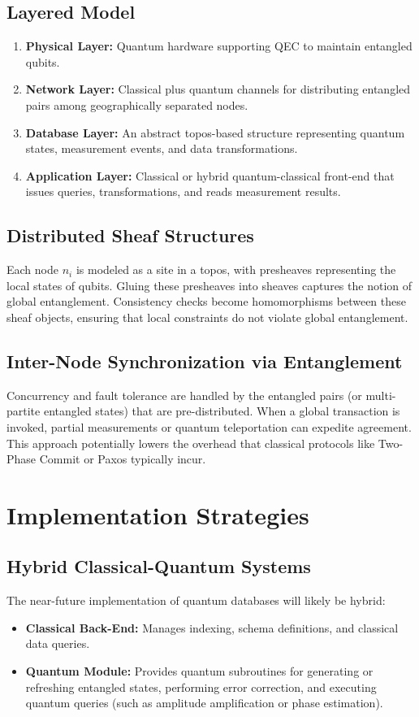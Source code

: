 \documentclass[12pt]{article}
\theoremstyle{definition}
\theoremstyle{remark}
\begin{document}
\subsection{Layered Model}
\begin{enumerate}[label=(\roman*)]
    \item \textbf{Physical Layer:} Quantum hardware supporting QEC to maintain entangled qubits.
    \item \textbf{Network Layer:} Classical plus quantum channels for distributing entangled pairs among geographically separated nodes.
    \item \textbf{Database Layer:} An abstract topos-based structure representing quantum states, measurement events, and data transformations.
    \item \textbf{Application Layer:} Classical or hybrid quantum-classical front-end that issues queries, transformations, and reads measurement results.
\end{enumerate}

\subsection{Distributed Sheaf Structures}
Each node $n_i$ is modeled as a site in a topos, with presheaves representing the local states of qubits. Gluing these presheaves into sheaves captures the notion of global entanglement. Consistency checks become homomorphisms between these sheaf objects, ensuring that local constraints do not violate global entanglement.

\subsection{Inter-Node Synchronization via Entanglement}
Concurrency and fault tolerance are handled by the entangled pairs (or multi-partite entangled states) that are pre-distributed. When a global transaction is invoked, partial measurements or quantum teleportation can expedite agreement. This approach potentially lowers the overhead that classical protocols like Two-Phase Commit or Paxos typically incur.

\section{Implementation Strategies}
\label{sec:implementation}

\subsection{Hybrid Classical-Quantum Systems}
The near-future implementation of quantum databases will likely be hybrid:
\begin{itemize}
    \item \textbf{Classical Back-End:} Manages indexing, schema definitions, and classical data queries.
    \item \textbf{Quantum Module:} Provides quantum subroutines for generating or refreshing entangled states, performing error correction, and executing quantum queries (such as amplitude amplification or phase estimation).
\end{itemize}
\end{document}

